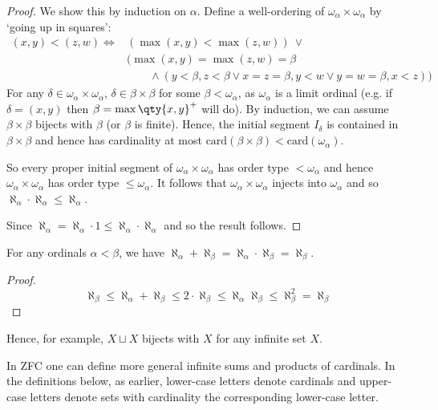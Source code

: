 \begin{proof}
    We show this by induction on $\alpha$.
    Define a well-ordering of $\omega_\alpha \times \omega_\alpha$ by `going up in squares':
    \begin{align*}
        (x,y) < (z,w) \iff &(\max(x,y) < \max(z,w)) \ \vee \\
        &(\max(x,y) = \max(z,w) = \beta \\
        &\quad\quad\wedge (y < \beta, z < \beta \vee x = z = \beta, y < w \vee y = w = \beta, x < z))
    \end{align*}
    For any $\delta \in \omega_\alpha \times \omega_\alpha$, $\delta \in \beta \times \beta$ for some $\beta < \omega_\alpha$, as $\omega_\alpha$ is a limit ordinal (e.g. if $\delta = (x, y)$ then $\beta = \max\qty{x, y}^+$ will do).
    By induction, we can assume $\beta \times \beta$ bijects with $\beta$ (or $\beta$ is finite).
    Hence, the initial segment $I_\delta$ is contained in $\beta \times \beta$ and hence has cardinality at most $\mathrm{card}(\beta \times \beta) < \mathrm{card}(\omega_\alpha)$.

    So every proper initial segment of $\omega_\alpha \times \omega_\alpha$ has order type $ < \omega_\alpha$ and hence $\omega_\alpha \times \omega_\alpha$ has order type $\leq \omega_\alpha$.
    It follows that $\omega_\alpha \times \omega_\alpha$ injects into $\omega_\alpha$ and so $\aleph_\alpha \cdot \aleph_\alpha \leq \aleph_\alpha$.

    Since $\aleph_\alpha = \aleph_\alpha \cdot 1 \leq \aleph_\alpha \cdot \aleph_\alpha$ and so the result follows.
\end{proof}

\begin{corollary} \label{cor:6-3}
    For any ordinals $\alpha < \beta$, we have $\aleph_\alpha + \aleph_\beta = \aleph_\alpha \cdot \aleph_\beta = \aleph_\beta$.
\end{corollary}

\begin{proof}
    \[ \aleph_\beta \leq \aleph_\alpha + \aleph_\beta \leq 2 \cdot \aleph_\beta \leq \aleph_\alpha \aleph_\beta \leq \aleph_\beta^2 = \aleph_\beta \]
\end{proof}

Hence, for example, $X \sqcup X$ bijects with $X$ for any infinite set $X$.

\begin{note}
    In ZFC one can define more general infinite sums and products of cardinals. In the definitions below, as earlier, lower-case letters denote cardinals and upper-case letters denote sets with cardinality the corresponding lower-case letter.
\end{note}

